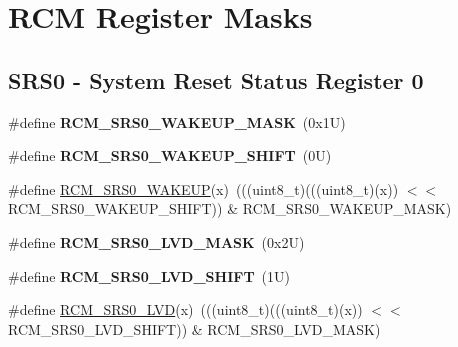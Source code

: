 \hypertarget{group___r_c_m___register___masks}{}\section{R\+CM Register Masks}
\label{group___r_c_m___register___masks}
\subsection*{S\+R\+S0 -\/ System Reset Status Register 0}
\begin{DoxyCompactItemize}
\item 
\mbox{\label{group___r_c_m___register___masks_gacdeb6976064d599d6cd063b26a25dbda}} 
\#define {\bfseries R\+C\+M\+\_\+\+S\+R\+S0\+\_\+\+W\+A\+K\+E\+U\+P\+\_\+\+M\+A\+SK}~(0x1\+U)
\item 
\mbox{\label{group___r_c_m___register___masks_ga2e140fc50106a6145cffe4b72671bbc2}} 
\#define {\bfseries R\+C\+M\+\_\+\+S\+R\+S0\+\_\+\+W\+A\+K\+E\+U\+P\+\_\+\+S\+H\+I\+FT}~(0\+U)
\item 
\#define \mbox{\hyperlink{group___r_c_m___register___masks_gaf1b4c911a4eb41127e9866208f3527c7}{R\+C\+M\+\_\+\+S\+R\+S0\+\_\+\+W\+A\+K\+E\+UP}}(x)~(((uint8\+\_\+t)(((uint8\+\_\+t)(x)) $<$$<$ R\+C\+M\+\_\+\+S\+R\+S0\+\_\+\+W\+A\+K\+E\+U\+P\+\_\+\+S\+H\+I\+FT)) \& R\+C\+M\+\_\+\+S\+R\+S0\+\_\+\+W\+A\+K\+E\+U\+P\+\_\+\+M\+A\+SK)
\item 
\mbox{\label{group___r_c_m___register___masks_ga4de74187b3bcc5b40a526b3ab5afda88}} 
\#define {\bfseries R\+C\+M\+\_\+\+S\+R\+S0\+\_\+\+L\+V\+D\+\_\+\+M\+A\+SK}~(0x2\+U)
\item 
\mbox{\label{group___r_c_m___register___masks_gad3f4cb02d84182ddd0933dc93e1ec4ba}} 
\#define {\bfseries R\+C\+M\+\_\+\+S\+R\+S0\+\_\+\+L\+V\+D\+\_\+\+S\+H\+I\+FT}~(1\+U)
\item 
\#define \mbox{\hyperlink{group___r_c_m___register___masks_ga5d394aa5b2a91b5963648d6d33a15411}{R\+C\+M\+\_\+\+S\+R\+S0\+\_\+\+L\+VD}}(x)~(((uint8\+\_\+t)(((uint8\+\_\+t)(x)) $<$$<$ R\+C\+M\+\_\+\+S\+R\+S0\+\_\+\+L\+V\+D\+\_\+\+S\+H\+I\+FT)) \& R\+C\+M\+\_\+\+S\+R\+S0\+\_\+\+L\+V\+D\+\_\+\+M\+A\+SK)
\item 
\mbox{\label{group___r_c_m___register___masks_gad203634bcb298bf54a3d5cce5c378a7e}} 

\end{DoxyCompactItemize}
